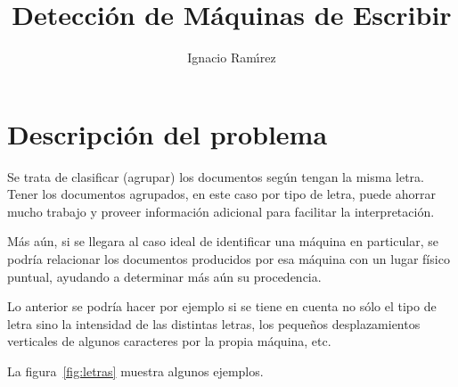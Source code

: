 \documentclass[11pt,a4paper]{article}
\author{Ignacio Ram\'{\i}rez}
\title{Detecci\'{o}n de M\'{a}quinas de Escribir}
\begin{document}
\maketitle

\section{Descripción del problema}

Se trata de clasificar (agrupar) los documentos según tengan la misma letra.
Tener los documentos agrupados, en este caso por tipo de letra, puede ahorrar
mucho trabajo y proveer información adicional para facilitar la interpretación.

Más aún, si se llegara al caso ideal de identificar una máquina en particular, se podría relacionar los documentos producidos por esa máquina con un lugar físico puntual, ayudando a determinar más aún su procedencia.

Lo anterior se podría hacer por ejemplo si se tiene en cuenta no sólo el tipo de letra sino la intensidad de las distintas letras, los pequeños desplazamientos verticales de algunos caracteres por la propia máquina, etc.


La figura~\ref{fig:letras} muestra algunos ejemplos.
\end{document}
